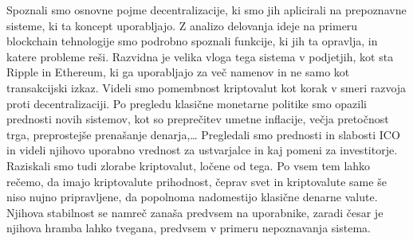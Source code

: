 \documentclass[letterpaper, titlepage, freqn]{article}
\begin{document}
Spoznali smo osnovne pojme decentralizacije, ki smo jih aplicirali na prepoznavne sisteme, ki ta koncept uporabljajo. Z analizo delovanja ideje na primeru blockchain tehnologije smo podrobno spoznali funkcije, ki jih ta opravlja, in katere probleme reši. Razvidna je velika vloga tega sistema v podjetjih, kot sta Ripple in Ethereum, ki ga uporabljajo za več namenov in ne samo kot transakcijski izkaz. Videli smo pomembnost kriptovalut kot korak v smeri razvoja proti decentralizaciji. Po pregledu klasične monetarne politike smo opazili prednosti novih sistemov, kot so preprečitev umetne inflacije, večja pretočnost trga, preprostejše prenašanje denarja,…  Pregledali smo prednosti in slabosti ICO in videli njihovo uporabno vrednost za ustvarjalce in kaj pomeni za investitorje. Raziskali smo tudi zlorabe kriptovalut, ločene od tega. Po vsem tem lahko rečemo, da imajo kriptovalute prihodnost, čeprav svet in kriptovalute same še niso nujno pripravljene, da popolnoma nadomestijo klasične denarne valute. Njihova stabilnost se namreč zanaša predvsem na uporabnike, zaradi česar je njihova hramba lahko tvegana, predvsem v primeru nepoznavanja sistema.
\end{document}
